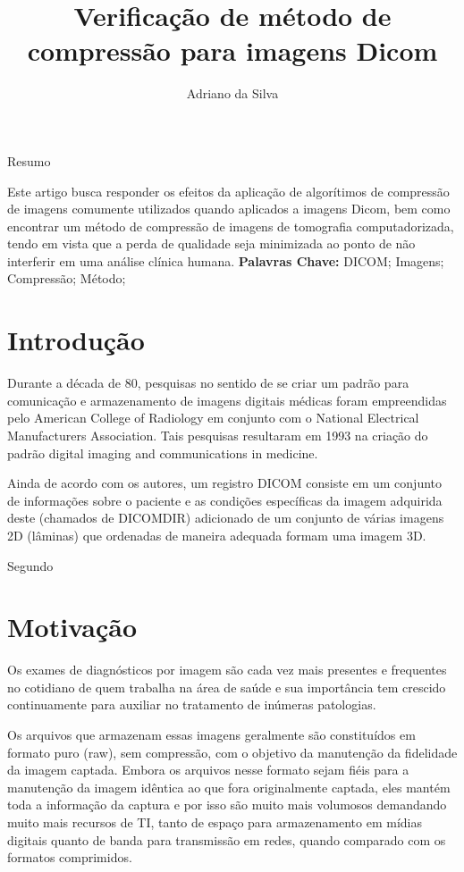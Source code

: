 \documentclass{IEEEtran}
\title{Verificação de método de compressão para imagens Dicom}
\author{Adriano da Silva}
\begin{document}
    
    
    \maketitle
    
    

    
    Resumo 

    Este artigo busca responder os efeitos da aplicação de algorítimos de
compressão de imagens comumente utilizados quando aplicados a imagens
Dicom, bem como encontrar um método de compressão de imagens de
tomografia computadorizada, tendo em vista que a perda de qualidade seja
minimizada ao ponto de não interferir em uma análise clínica humana.
\textbf{Palavras Chave:} DICOM; Imagens; Compressão; Método;

    \section{Introdução}\label{introduuxe7uxe3o}

    Durante a década de 80, pesquisas no sentido de se criar um padrão para
comunicação e armazenamento de imagens digitais médicas foram
empreendidas pelo American College of Radiology em conjunto com o
National Electrical Manufacturers Association. Tais pesquisas resultaram
em 1993 na criação do padrão digital imaging and communications in
medicine. \cite{grauer2009working}

Ainda de acordo com os autores, um registro DICOM consiste em um
conjunto de informações sobre o paciente e as condições específicas da
imagem adquirida deste (chamados de DICOMDIR) adicionado de um conjunto
de várias imagens 2D (lâminas) que ordenadas de maneira adequada formam
uma imagem 3D.

Segundo \cite{koff2009pan}

    \section{Motivação}\label{motivauxe7uxe3o}

    Os exames de diagnósticos por imagem são cada vez mais presentes e
frequentes no cotidiano de quem trabalha na área de saúde e sua
importância tem crescido continuamente para auxiliar no tratamento de
inúmeras patologias.

Os arquivos que armazenam essas imagens geralmente são constituídos em
formato puro (raw), sem compressão, com o objetivo da manutenção da
fidelidade da imagem captada. Embora os arquivos nesse formato sejam
fiéis para a manutenção da imagem idêntica ao que fora originalmente
captada, eles mantém toda a informação da captura e por isso são muito
mais volumosos demandando muito mais recursos de TI, tanto de espaço
para armazenamento em mídias digitais quanto de banda para transmissão
em redes, quando comparado com os formatos comprimidos.
\end{document}
